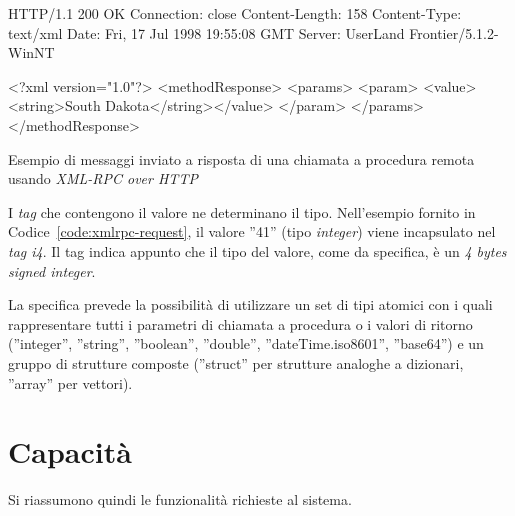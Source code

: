 \begin{program}
\begin{verbatimtab}
HTTP/1.1 200 OK
Connection: close
Content-Length: 158
Content-Type: text/xml
Date: Fri, 17 Jul 1998 19:55:08 GMT
Server: UserLand Frontier/5.1.2-WinNT


<?xml version="1.0"?>
<methodResponse>
   <params>
      <param>
         <value><string>South Dakota</string></value>
         </param>
      </params>
   </methodResponse>
\end{verbatimtab}
\caption{Esempio di messaggi inviato a risposta di una chiamata a procedura remota usando \emph{XML-RPC over HTTP}}\label{code:xmlrpc-response}
\end{program}

I \emph{tag} che contengono il valore ne determinano il tipo. Nell'esempio fornito in Codice~\ref{code:xmlrpc-request}, il valore ''41'' (tipo \emph{integer}) viene incapsulato nel \emph{tag i4}. Il tag indica appunto che il tipo del valore, come da specifica, è un \emph{4 bytes signed integer}.

La specifica prevede la possibilità di utilizzare un set di tipi atomici con i quali rappresentare tutti i parametri di chiamata a procedura o i valori di ritorno (''integer'', ''string'', ''boolean'', ''double'', ''dateTime.iso8601'', ''base64'') e un gruppo di strutture composte (''struct'' per strutture analoghe a dizionari, ''array'' per vettori).~\cite{xmlrpcspec}

\section{Capacità}

Si riassumono quindi le funzionalità richieste al sistema.

